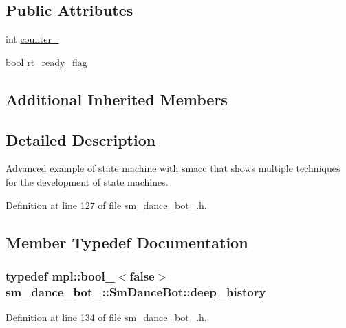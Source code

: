 \subsection*{Public Attributes}
\begin{DoxyCompactItemize}
\item 
int \hyperlink{structsm__dance__bot__3_1_1SmDanceBot_ad91a1bf0a46ee80bebe007a75cbe429d}{counter\+\_}
\item 
\hyperlink{classbool}{bool} \hyperlink{structsm__dance__bot__3_1_1SmDanceBot_a3f8e3b6a1b7cb4984e9fe281d84a2ab2}{rt\+\_\+ready\+\_\+flag}
\end{DoxyCompactItemize}
\subsection*{Additional Inherited Members}


\subsection{Detailed Description}
Advanced example of state machine with smacc that shows multiple techniques for the development of state machines. 

Definition at line 127 of file sm\+\_\+dance\+\_\+bot\+\_.\+h.



\subsection{Member Typedef Documentation}
\subsubsection[{\texorpdfstring{deep\+\_\+history}{deep_history}}]{\setlength{\rightskip}{0pt plus 5cm}typedef mpl\+::bool\+\_\+$<$false$>$ {\bf sm\+\_\+dance\+\_\+bot\+\_\+::\+Sm\+Dance\+Bot\+::deep\+\_\+history}}\hypertarget{structsm__dance__bot__3_1_1SmDanceBot_af4725d37e5f9649b7ca07382435e7287}{}\label{structsm__dance__bot__3_1_1SmDanceBot_af4725d37e5f9649b7ca07382435e7287}


Definition at line 134 of file sm\+\_\+dance\+\_\+bot\+\_.\+h.

